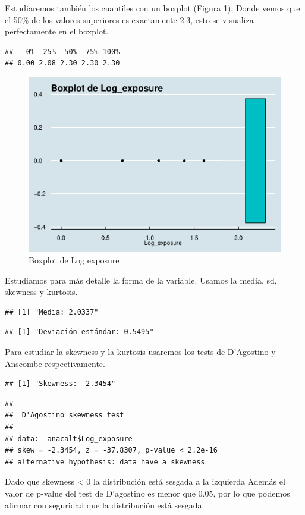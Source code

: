 \documentclass[
]{article}
\begin{document}
Estudiaremos también los cuantiles con un boxplot (Figura
\ref{fig:box_log}). Donde vemos que el 50\% de los valores superiores es
exactamente 2.3, esto se visualiza perfectamente en el boxplot.

\begin{verbatim}
##   0%  25%  50%  75% 100% 
## 0.00 2.08 2.30 2.30 2.30
\end{verbatim}

\begin{figure}

{\centering \includegraphics[width=0.5\linewidth]{anacalt-regresion_files/figure-latex/box_log-1} 

}

\caption{Boxplot de Log exposure}\label{fig:box_log}
\end{figure}

Estudiamos para más detalle la forma de la variable. Usamos la media,
sd, skewness y kurtosis.

\begin{verbatim}
## [1] "Media: 2.0337"
\end{verbatim}

\begin{verbatim}
## [1] "Deviación estándar: 0.5495"
\end{verbatim}

Para estudiar la skewness y la kurtosis usaremos los tests de D'Agostino
y Anscombe respectivamente.

\begin{verbatim}
## [1] "Skewness: -2.3454"
\end{verbatim}

\begin{verbatim}
## 
##  D'Agostino skewness test
## 
## data:  anacalt$Log_exposure
## skew = -2.3454, z = -37.8307, p-value < 2.2e-16
## alternative hypothesis: data have a skewness
\end{verbatim}

Dado que skewness \textless{} 0 la distribución está sesgada a la
izquierda Además el valor de p-value del test de D'agostino es menor que
0.05, por lo que podemos afirmar con seguridad que la distribución está
sesgada.
\end{document}
